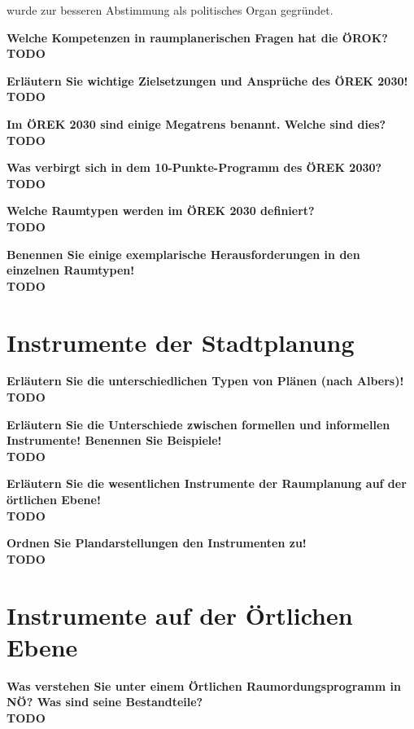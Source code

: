 \documentclass[]{article}
\newenvironment{question}{\vspace{8mm}\noindent\bfseries}{\\}
\begin{document}
wurde zur besseren Abstimmung als politisches Organ gegründet.


\begin{question}
	Welche Kompetenzen in raumplanerischen Fragen hat die ÖROK?
\end{question}
TODO


\begin{question}
	Erläutern Sie wichtige Zielsetzungen und Ansprüche des ÖREK 2030!
\end{question}
TODO


\begin{question}
	Im ÖREK 2030 sind einige Megatrens benannt. Welche sind dies?
\end{question}
TODO


\begin{question}
	Was verbirgt sich in dem 10-Punkte-Programm des ÖREK 2030?
\end{question}
TODO


\begin{question}
	Welche Raumtypen werden im ÖREK 2030 definiert?
\end{question}
TODO


\begin{question}
	Benennen Sie einige exemplarische Herausforderungen in den einzelnen Raumtypen!
\end{question}
TODO


\section{Instrumente der Stadtplanung}
\begin{question}
	Erläutern Sie die unterschiedlichen Typen von Plänen (nach Albers)!
\end{question}
TODO


\begin{question}
	Erläutern Sie die Unterschiede zwischen formellen und informellen Instrumente! Benennen Sie Beispiele!
\end{question}
TODO


\begin{question}
	Erläutern Sie die wesentlichen Instrumente der Raumplanung auf der örtlichen Ebene!
\end{question}
TODO


\begin{question}
	Ordnen Sie Plandarstellungen den Instrumenten zu!
\end{question}
TODO


\section{Instrumente auf der Örtlichen Ebene}
\begin{question}
	Was verstehen Sie unter einem Örtlichen Raumordungsprogramm in NÖ? Was sind seine Bestandteile?
\end{question}
TODO
\end{document}

